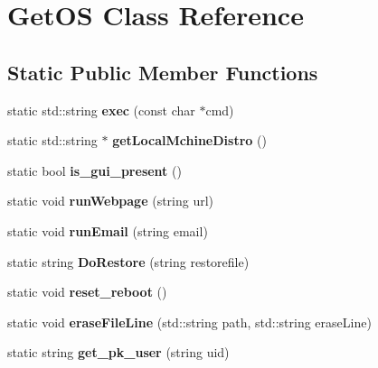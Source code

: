 \hypertarget{classGetOS}{}\section{Get\+OS Class Reference}
\label{classGetOS}
\subsection*{Static Public Member Functions}
\begin{DoxyCompactItemize}
\item 
\mbox{\label{classGetOS_af120e30a1ceb3bcc80c0dd857600e4f1}} 
static std\+::string {\bfseries exec} (const char $\ast$cmd)
\item 
\mbox{\label{classGetOS_a7ce8e4159395a9e42c5e0b43ddcc2ca9}} 
static std\+::string $\ast$ {\bfseries get\+Local\+Mchine\+Distro} ()
\item 
\mbox{\label{classGetOS_a860a6baf194a499df4466d393be1cad5}} 
static bool {\bfseries is\+\_\+gui\+\_\+present} ()
\item 
\mbox{\label{classGetOS_af95ff65d8891872c38aed10437370d44}} 
static void {\bfseries run\+Webpage} (string url)
\item 
\mbox{\label{classGetOS_ab6860b2c5abf50d49e216967503a5e4f}} 
static void {\bfseries run\+Email} (string email)
\item 
\mbox{\label{classGetOS_a1ef4ea5af8c1d2b577cd244da9c95d7e}} 
static string {\bfseries Do\+Restore} (string restorefile)
\item 
\mbox{\label{classGetOS_a7b99affc7fab2998f0b3a08fc657f1bc}} 
static void {\bfseries reset\+\_\+reboot} ()
\item 
\mbox{\label{classGetOS_adf98e4b52f142de6a32470300302b347}} 
static void {\bfseries erase\+File\+Line} (std\+::string path, std\+::string erase\+Line)
\item 
\mbox{\label{classGetOS_accf262e767160c1cb37640e411e05645}} 
static string {\bfseries get\+\_\+pk\+\_\+user} (string uid)
\end{DoxyCompactItemize}
